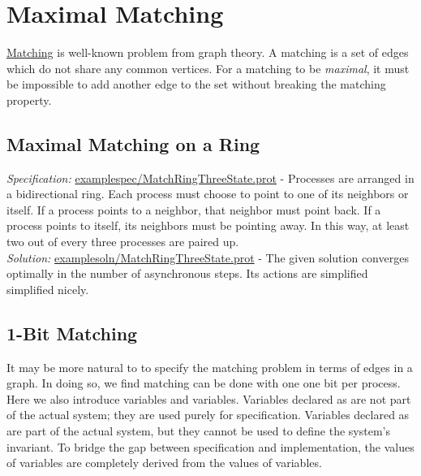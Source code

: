 \section{Maximal Matching}

\href{http://en.wikipedia.org/wiki/Matching_(graph_theory)}{Matching} is well-known problem from graph theory.
A matching is a set of edges which do not share any common vertices.
For a matching to be \textit{maximal}, it must be impossible to add another edge to the set without breaking the matching property.

\subsection{Maximal Matching on a Ring}

\textit{Specification:} \url{examplespec/MatchRingThreeState.prot}
- Processes are arranged in a bidirectional ring.
Each process must choose to point to one of its neighbors or itself.
If a process points to a neighbor, that neighbor must point back.
If a process points to itself, its neighbors must be pointing away.
In this way, at least two out of every three processes are paired up.
\\\textit{Solution:} \url{examplesoln/MatchRingThreeState.prot}
- The given solution converges optimally in the number of asynchronous steps.
Its actions are simplified simplified nicely.

\subsection{1-Bit Matching}
It may be more natural to to specify the matching problem in terms of edges in a graph.
In doing so, we find matching can be done with one one bit per process.
Here we also introduce  variables and  variables.
Variables declared as  are not part of the actual system; they are used purely for specification.
Variables declared as  are part of the actual system, but they cannot be used to define the system's invariant.
To bridge the gap between specification and implementation, the values of  variables are completely derived from the values of  variables.

